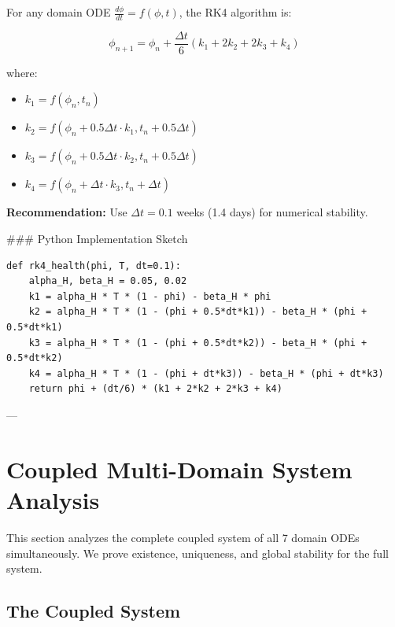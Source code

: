 For any domain ODE $\frac{d\phi}{dt} = f(\phi, t)$, the RK4 algorithm is:

\begin{equation}
\phi_{n+1} = \phi_n + \frac{\Delta t}{6}(k_1 + 2k_2 + 2k_3 + k_4)
\end{equation}

where:
\begin{itemize}[nosep]
\item $k_1 = f(\phi_n, t_n)$
\item $k_2 = f(\phi_n + 0.5 \Delta t \cdot k_1, t_n + 0.5\Delta t)$
\item $k_3 = f(\phi_n + 0.5 \Delta t \cdot k_2, t_n + 0.5\Delta t)$
\item $k_4 = f(\phi_n + \Delta t \cdot k_3, t_n + \Delta t)$
\end{itemize}

\textbf{Recommendation:} Use $\Delta t = 0.1$ weeks (1.4 days) for numerical stability.

### Python Implementation Sketch

\begin{verbatim}
def rk4_health(phi, T, dt=0.1):
    alpha_H, beta_H = 0.05, 0.02
    k1 = alpha_H * T * (1 - phi) - beta_H * phi
    k2 = alpha_H * T * (1 - (phi + 0.5*dt*k1)) - beta_H * (phi + 0.5*dt*k1)
    k3 = alpha_H * T * (1 - (phi + 0.5*dt*k2)) - beta_H * (phi + 0.5*dt*k2)
    k4 = alpha_H * T * (1 - (phi + dt*k3)) - beta_H * (phi + dt*k3)
    return phi + (dt/6) * (k1 + 2*k2 + 2*k3 + k4)
\end{verbatim}

---


\section{Coupled Multi-Domain System Analysis}
\label{ooo:coupled}

\begin{tcolorbox}[colback=blue!5!white, colframe=blue!75!black, title=Purpose]
This section analyzes the complete coupled system of all 7 domain ODEs simultaneously.
We prove existence, uniqueness, and global stability for the full system.
\end{tcolorbox}

\subsection{The Coupled System}

